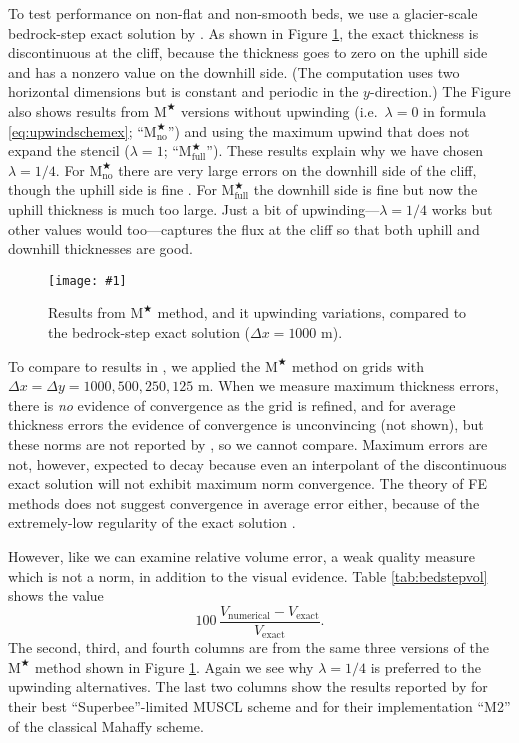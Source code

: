 \documentclass[twocolumn,letterpaper]{igs}
\newcommand{\onecol}[1]{\texttt{[image: \#1]}}
\newcommand{\Mstar}{$\text{M}^{\bigstar}$\xspace}
\newcommand{\Mstarnoup}{$\text{M}^{\bigstar}_{\text{no}}$\xspace}
\newcommand{\Mstarfullup}{$\text{M}^{\bigstar}_{\text{full}}$\xspace}
\begin{document}
To test performance on non-flat and non-smooth beds, we use a glacier-scale bedrock-step exact solution by \cite{JaroschSchoofAnslow2013}.  As shown in Figure \ref{fig:bedstepprofiles}, the exact thickness is discontinuous at the cliff, because the thickness goes to zero on the uphill side and has a nonzero value on the downhill side.  (The computation uses two horizontal dimensions but is constant and periodic in the $y$-direction.)  The Figure also shows results from \Mstar versions without upwinding (i.e.~$\lambda=0$ in formula \eqref{eq:upwindschemex}; ``\Mstarnoup'') and using the maximum upwind that does not expand the stencil ($\lambda=1$; ``\Mstarfullup'').  These results explain why we have chosen $\lambda=1/4$.  For \Mstarnoup there are very large errors on the downhill side of the cliff, though the uphill side is fine \citep{JaroschSchoofAnslow2013}.  For \Mstarfullup the downhill side is fine but now the uphill thickness is much too large.  Just a bit of upwinding---$\lambda=1/4$ works but other values would too---captures the flux at the cliff so that both uphill and downhill thicknesses are good.

\begin{figure}[ht]
\onecol{bedstepprofiles.pdf}
\caption{Results from \Mstar method, and it upwinding variations, compared to the bedrock-step exact solution ($\Delta x=1000$ m).}
\label{fig:bedstepprofiles}
\end{figure}

To compare to results in \citep{JaroschSchoofAnslow2013}, we applied the \Mstar method on grids with $\Delta x=\Delta y = 1000,500,250,125$ m.  When we measure maximum thickness errors, there is \emph{no} evidence of convergence as the grid is refined, and for average thickness errors the evidence of convergence is unconvincing (not shown), but these norms are not reported by \cite{JaroschSchoofAnslow2013}, so we cannot compare.  Maximum errors are not, however, expected to decay because even an interpolant of the discontinuous exact solution will not exhibit maximum norm convergence.  The theory of FE methods does not suggest convergence in average error either, because of the extremely-low regularity of the exact solution \citep{Elmanetal2005}.

However, like \cite{JaroschSchoofAnslow2013} we can examine relative volume error, a weak quality measure which is not a norm, in addition to the visual evidence.  Table \ref{tab:bedstepvol} shows the value
\begin{equation}
100\, \frac{V_{\text{numerical}} - V_{\text{exact}}}{V_{\text{exact}}}. \label{eq:volrel}
\end{equation}
The second, third, and fourth columns are from the same three versions of the \Mstar method shown in Figure \ref{fig:bedstepprofiles}.  Again we see why $\lambda=1/4$ is preferred to the upwinding alternatives.  The last two columns show the results reported by \cite{JaroschSchoofAnslow2013} for their best ``Superbee''-limited MUSCL scheme and for their implementation ``M2'' of the classical Mahaffy scheme.
\end{document}
